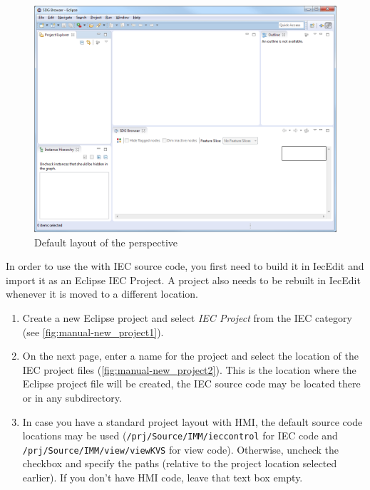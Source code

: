 \begin{figure}[htp]
  \centering
    \includegraphics[width=\textwidth]{bilder/manual-perspective}
  \caption{Default layout of the \emph{\SB} perspective}
  \label{fig:manual-perspective}
\end{figure}

In order to use the \SB with IEC source code, you first need to build it in IecEdit and import it as an Eclipse IEC 
Project. A project also needs to be rebuilt in IecEdit whenever it is moved to a different location.

\begin{enumerate}
  \item Create a new Eclipse project and select \emph{IEC Project} from the IEC category (see 
  \autoref{fig:manual-new_project1}).
  
  \item On the next page, enter a name for the project and select the location of the IEC project files 
  (\autoref{fig:manual-new_project2}). This is the location where the Eclipse project file will be created, the IEC 
  source code may be located there or in any subdirectory.
  
  \item In case you have a standard project layout with HMI, the default source code locations may be used 
  (\texttt{/prj/Source/IMM/ieccontrol} for IEC code and \texttt{/prj/Source/IMM/view/viewKVS} for view code). 
  Otherwise, uncheck the checkbox and specify the paths (relative to the project location selected earlier). If you 
  don't have HMI code, leave that text box empty.
\end{enumerate}

